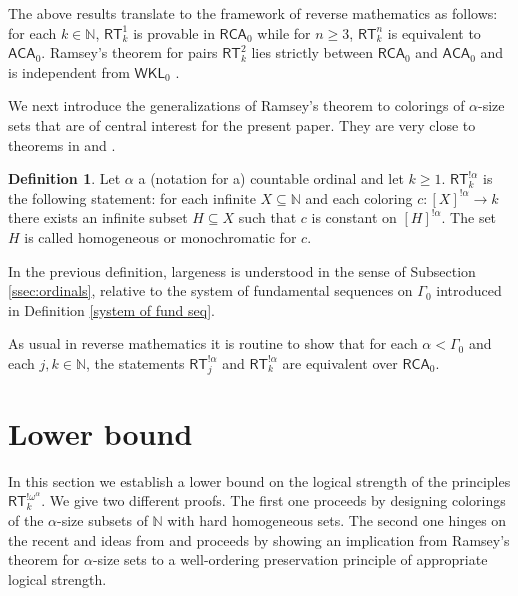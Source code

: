 \documentclass[11pt]{amsart}
\theoremstyle{definition}
\newtheorem{definition}[thm]{Definition}
\theoremstyle{remark}
\theoremstyle{plain}
\newcommand{\numberset}{\mathbb}
\newcommand{\N}{\numberset{N}}
\def\a{\alpha}
\def\G{\Gamma}
\newcommand{\RCA}{\mathsf{RCA}_0}
\newcommand{\WKL}{\mathsf{WKL}_0}
\newcommand{\ACA}{\mathsf{ACA}_0}
\newcommand{\RT}{\mathsf{RT}}
\def\N{{\mathbb{N}}}
\newcommand{\lorenzo}[1]{\textcolor{blue}{#1}}
\begin{document}
The above results translate to the framework of reverse mathematics as follows: for each $k\in \N$, $\RT^1_k$ is provable in $\RCA$ while for $n \ge 3$, $\RT^n_k$ is equivalent to $\ACA$. 
Ramsey's theorem for pairs $\RT^2_k$ lies strictly between $\RCA$ \cite{specker1971ramsey} and $\ACA$ \cite{seetapunslaman} and is independent from $\WKL$ \cite{Liu:12}.

We next introduce the generalizations of Ramsey's theorem to colorings of $\a$-size sets that are of central interest for the present paper. They are very close to theorems in \cite{Pud-Rod:82} and \cite{Far-Neg:08}. 

\begin{definition}
Let $\a$ a (notation for a) countable ordinal and let $k\geq 1$. 
$\RT^{!\alpha}_k$ is the following statement: for each infinite $X \subseteq \N$ and each coloring $c \colon [X]^{! \alpha} \to k$ there exists an infinite subset $H\subseteq X$ such that $c$ is constant on $[H]^{!\a}$. 
The set $H$ is called homogeneous or monochromatic for $c$.
\end{definition}

In the previous definition, largeness is understood in the sense of Subsection \ref{ssec:ordinals}, relative to the system of fundamental sequences on $\Gamma_0$ introduced in Definition \ref{system of fund seq}.  


As usual in reverse mathematics it is routine to show that for each $\a < \G_0$ and each $j,k \in \N$, the statements $\RT^{! \a}_j$ and $\RT^{!\a}_k$ are equivalent over $\RCA$.


%
%
%
%


\section{Lower bound}\label{sec:lower}


%
%
%
%


In this section we establish a lower bound on the logical strength of the principles $\RT^{!\omega^\a}_k$. We give two different proofs. The first one proceeds by designing colorings of the $\alpha$-size subsets of $\N$ with hard homogeneous sets. The second one hinges on the recent \cite{marcone2025} and ideas from \cite{carlucci2025} and proceeds by showing an implication from Ramsey's theorem for $\alpha$-size sets to a well-ordering preservation principle of appropriate logical strength. 

\end{document}
